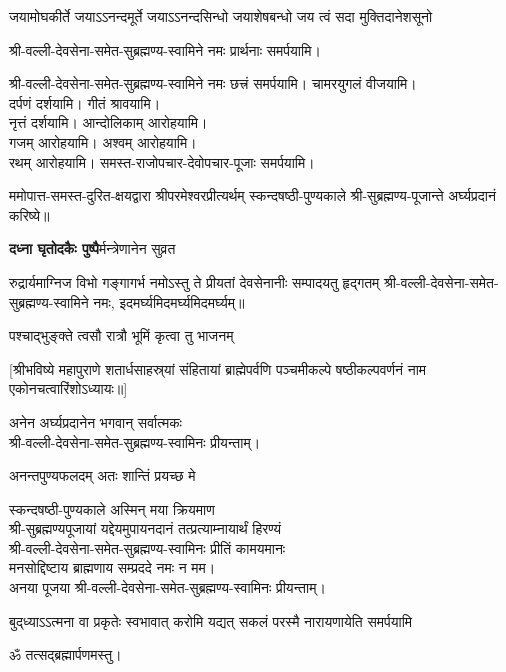 \begin{center}
{जयामोघकीर्ते जयाऽऽनन्दमूर्ते}
{जयाऽऽनन्दसिन्धो जयाशेषबन्धो}
{जय त्वं सदा मुक्तिदानेशसूनो}

श्री-वल्ली-देवसेना-समेत-सुब्रह्मण्य-स्वामिने नमः प्रार्थनाः समर्पयामि।

श्री-वल्ली-देवसेना-समेत-सुब्रह्मण्य-स्वामिने नमः छत्त्रं समर्पयामि।
चामरयुगलं वीजयामि।\\
दर्पणं दर्शयामि। गीतं श्रावयामि। \\
नृत्तं दर्शयामि। आन्दोलिकाम् आरोहयामि।\\
गजम् आरोहयामि। अश्वम् आरोहयामि।\\
रथम् आरोहयामि। समस्त-राजोपचार-देवोपचार-पूजाः समर्पयामि।


ममोपात्त-समस्त-दुरित-क्षयद्वारा श्रीपरमेश्वरप्रीत्यर्थम् स्कन्दषष्ठी-पुण्यकाले श्री-सुब्रह्मण्य-पूजान्ते अर्घ्यप्रदानं करिष्ये॥

\medskip

{\textbf{दध्ना घृतोदकैः पुष्पै}र्मन्त्रेणानेन सुव्रत}

{रुद्रार्यमाग्निज विभो गङ्गागर्भ नमोऽस्तु ते}
{प्रीयतां देवसेनानीः सम्पादयतु हृद्गतम्}
श्री-वल्ली-देवसेना-समेत-सुब्रह्मण्य-स्वामिने नमः, इदमर्घ्यमिदमर्घ्यमिदमर्घ्यम्॥\medskip

{पश्चाद्भुङ्क्ते त्वसौ रात्रौ भूमिं कृत्वा तु भाजनम्}

[श्रीभविष्ये महापुराणे शतार्धसाहस्र्यां संहितायां ब्राह्मेपर्वणि पञ्चमीकल्पे षष्ठीकल्पवर्णनं नाम एकोनचत्वारिंशोऽध्यायः॥]


अनेन अर्घ्यप्रदानेन भगवान् सर्वात्मकः\\ श्री-वल्ली-देवसेना-समेत-सुब्रह्मण्य-स्वामिनः प्रीयन्ताम्।\medskip

{अनन्तपुण्यफलदम् अतः शान्तिं प्रयच्छ मे}

स्कन्दषष्ठी-पुण्यकाले अस्मिन् मया क्रियमाण\\
श्री-सुब्रह्मण्यपूजायां यद्देयमुपायनदानं तत्प्रत्याम्नायार्थं हिरण्यं\\
श्री-वल्ली-देवसेना-समेत-सुब्रह्मण्य-स्वामिनः प्रीतिं कामयमानः\\
मनसोद्दिष्टाय ब्राह्मणाय सम्प्रददे नमः न मम।\\ 
अनया पूजया श्री-वल्ली-देवसेना-समेत-सुब्रह्मण्य-स्वामिनः प्रीयन्ताम्। 
 

{बुद्‌ध्याऽऽत्मना वा प्रकृतेः स्वभावात्}
{करोमि यद्यत् सकलं परस्मै}
{नारायणायेति समर्पयामि}

ॐ तत्सद्ब्रह्मार्पणमस्तु।

\end{center}